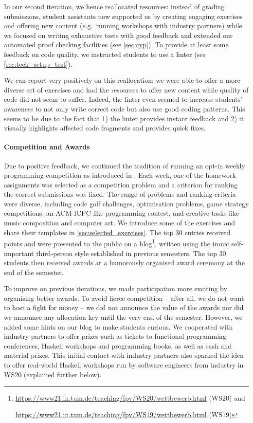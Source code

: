 In our second iteration, we hence reallocated resources:
instead of grading submissions,
student assistants now supported us by creating engaging exercises
and offering new content (e.g.\ running workshops with industry partners)
while we focused on writing exhaustive tests with good feedback and extended our automated proof checking facilities (see \cref{sec:cyp}).
To provide at least some feedback on
code quality, we instructed students
to use a linter (see \cref{sec:tech_setup_test}).

We can report very positively on this reallocation:
we were able to offer a more diverse set of exercises and
had the resources to offer new content
while quality of code did not seem to suffer.
Indeed, the linter even seemed to increase students' awareness
to not only write correct code but also use good coding patterns.
This seems to be due to the fact that 1) the linter provides instant feedback and 2) it visually highlights affected code fragments and provides quick fixes.

\paragraph{Competition and Awards}
Due to positive feedback,
we continued the tradition of running an opt-in weekly
programming competition as introduced in \cite{next_1100}.
Each week, one of the homework assignments
was selected as a competition problem
and a criterion for ranking the correct submissions was fixed.
The range of problems and ranking criteria were diverse,
including code golf challenges,
optimisation problems,
game strategy competitions,
an ACM-ICPC-like programming contest,
and creative tasks like music composition
and computer art.
We introduce some of the exercises and share their templates in \cref{sec:selected_exercises}.
The top 30 entries received points
and were presented to the public on a blog\footnote{\url{https://www21.in.tum.de/teaching/fpv/WS20/wettbewerb.html} (WS20) and

\url{https://www21.in.tum.de/teaching/fpv/WS19/wettbewerb.html} (WS19)},
written using the ironic self-important third-person style established in previous semesters.
The top 30 students then received awards at
a humorously organised award ceremony at the end of the semester.

To improve on previous iterations,
we made participation more exciting by organising better awards.
To avoid fierce competition -- after all, we do not want to host a fight for money --
we did not announce the value of the awards nor did we announce any allocation key
until the very end of the semester.
However, we added some hints on our blog to make students curious.
We cooperated with industry partners
to offer prizes such as tickets to functional programming conferences,
Haskell workshops and programming books, as well as cash and material prizes.
This initial contact with industry partners
also sparked the idea to offer real-world Haskell workshops
run by software engineers from industry in WS20 (explained further below).

